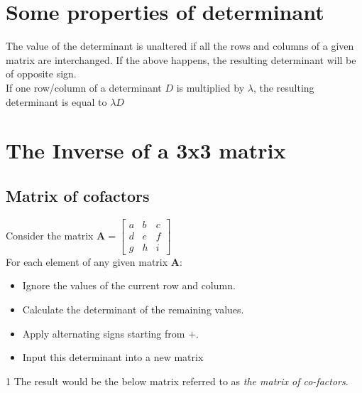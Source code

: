\section{Some properties of determinant}
The value of the determinant is unaltered if all the rows and columns of a given matrix are interchanged. If the above happens, the resulting determinant will be of opposite sign.\\
 If one row/column of a determinant $D$ is multiplied by $\lambda$, the resulting determinant is equal to $\lambda D$

\section{The Inverse of a 3x3 matrix}


\subsection{Matrix of cofactors}
Consider the matrix $\mathbf A = \begin{bmatrix}a&b&c\\d&e&f\\g&h&i\end{bmatrix}$\\

\noindent For each element of any given matrix $\mathbf A$:
	\begin{itemize}
\item{Ignore the values of the current row and column.}
\item{Calculate the determinant of the remaining values.}
\item{Apply alternating signs starting from $+$.}
\item{Input this determinant into a new matrix}
	\end{itemize}1
The result would be the below matrix referred to as \emph{the matrix of co-factors}.

